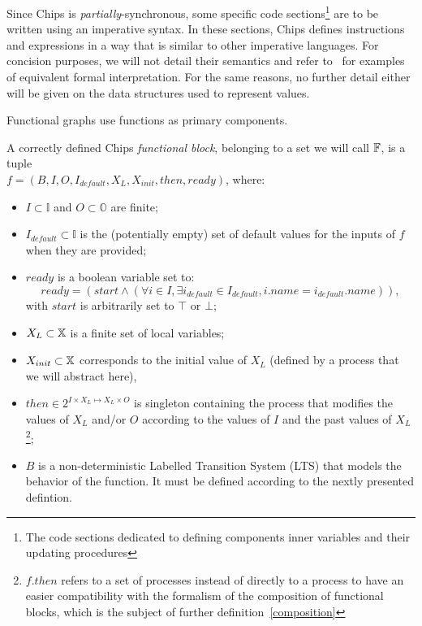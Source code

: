 \documentclass[runningheads]{llncs}
\begin{document}
\begin{remark}
    Since Chips is \emph{partially}-synchronous, some specific code sections\footnote{The code sections dedicated to defining components inner variables and their updating procedures} are to be written using an imperative syntax. In these sections, Chips defines instructions and expressions in a way that is similar to other imperative languages. For concision purposes, we will not detail their semantics and refer to~\cite{plotkin_structural_1981} for examples of equivalent formal interpretation. For the same reasons, no further detail either will be given on the data structures used to represent values.
\end{remark}

Functional graphs use functions as primary components.

\begin{definition}\label{functional_block}
    A correctly defined Chips \emph{functional block}, belonging to a set we will call $\mathbb{F}$, is a tuple\\$f = (B, I, O, I_{default},X_L, X_{init}, then, ready)$, where:
    \begin{itemize}
        \item $I \subset \mathbb{I}$ and $O\subset\mathbb{O}$ are finite;
        \item $I_{default} \subset \mathbb{I}$ is the (potentially empty) set of default values for the inputs of $f$ when they are provided;
        \item $ready$ is a boolean variable set to:
        \begin{equation*}
            ready = (start \wedge (\forall i \in I, \exists i_{default} \in I_{default}, i.name = i_{default}.name)),
        \end{equation*} 
        with $start$ is arbitrarily set to $\top$ or $\bot$;
        \item $X_L \subset \mathbb{X}$ is a finite set of local variables;
        \item $X_{init} \subset \mathbb{X}$ corresponds to the initial value of $X_L$ (defined by a process that we will abstract here),
        \item $then \in 2^{I \times X_L \mapsto X_L \times O}$ is singleton containing the process that modifies the values of $X_L$ and/or $O$ according to the values of $I$ and the past values of $X_L$\footnote{$f.then$ refers to a set of processes instead of directly to a process to have an easier compatibility with the formalism of the composition of functional blocks, which is the subject of further definition~\ref{composition}};
        \item $B$ is a non-deterministic Labelled Transition System (LTS) that models the behavior of the function. It must be defined according to the nextly presented defintion.
    \end{itemize}
\end{definition}
\end{document}
